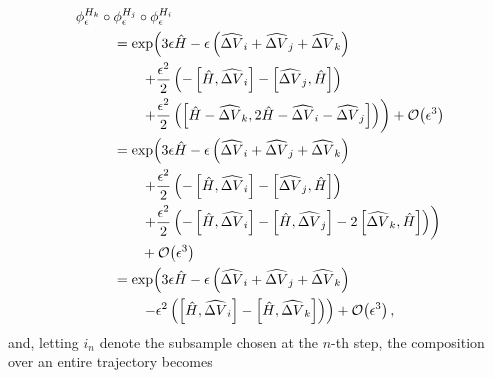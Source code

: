 \documentclass{article}
\begin{document}
\begin{align*}
\phi^{H_{k}}_{\epsilon} \circ \phi^{H_{j}}_{\epsilon} \circ \phi^{H_{i}}_{\epsilon}
&
\\
& \hspace{-15mm} =
\exp \! \left( 
3 \epsilon \hat{H} 
- \epsilon \left( \widehat{ \Delta V}_{i} +  \widehat{ \Delta V}_{j} +  \widehat{ \Delta V}_{k} \right)
\right.
\\
& \hspace{-8mm} \left.
+ \frac{\epsilon^{2}}{2} \left(
- \left[ \hat{H}, \widehat{ \Delta V}_{i} \right]
- \left[ \widehat{ \Delta V}_{j}, \hat{H} \right] \right) \right.
\\
& \hspace{-8mm} \left.
+ \frac{\epsilon^{2}}{2} \left(
\left[ \hat{H} - \widehat{ \Delta V}_{k}, 2 \hat{H} - \widehat{ \Delta V}_{i} - \widehat{ \Delta V}_{j} \right]
\right)
\right)
+ \mathcal{O} \! \left( \epsilon^{3} \right)
\\
& \hspace{-15mm} =
\exp \! \left( 
3 \epsilon \hat{H} 
- \epsilon \left( \widehat{ \Delta V}_{i} + \widehat{ \Delta V}_{j} + \widehat{ \Delta V}_{k} \right)
\right.
\\
& \hspace{-8mm} \left.
+ \frac{\epsilon^{2}}{2} \left(
- \left[ \hat{H}, \widehat{ \Delta V}_{i} \right]
- \left[ \widehat{ \Delta V}_{j}, \hat{H} \right] \right) \right.
\\
& \hspace{-8mm} \left.
+ \frac{\epsilon^{2}}{2} \left(
- \left[ \hat{H}, \widehat{ \Delta V}_{i} \right]
- \left[ \hat{H}, \widehat{ \Delta V}_{j} \right]
- 2 \left[ \widehat{ \Delta V}_{k}, \hat{H} \right] \right) \right)
\\
& \hspace{-8mm}
+ \mathcal{O} \! \left( \epsilon^{3} \right)
\\
& \hspace{-15mm} =
\exp \! \left( 
3 \epsilon \hat{H} 
- \epsilon \left( \widehat{ \Delta V}_{i} + \widehat{ \Delta V}_{j} + \widehat{ \Delta V}_{k} \right)
\right.
\\
& \hspace{-8mm} \left.
- \epsilon^{2} \left( \left[ \hat{H}, \widehat{ \Delta V}_{i} \right] 
- \left[ \hat{H}, \widehat{ \Delta V}_{k} \right] \right)
\right) + \mathcal{O} \! \left( \epsilon^{3} \right),
\end{align*}
%
and, letting $i_{n}$ denote the subsample chosen at the $n$-th step, the composition over
an entire trajectory becomes
\end{document}
